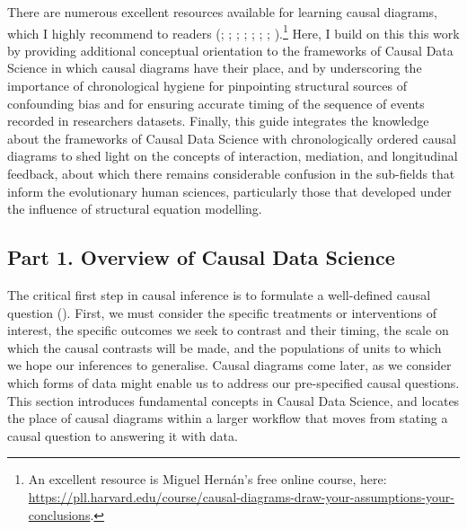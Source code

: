 \documentclass[
  singlecolumn,
  9pt]{article}
\begin{document}
There are numerous excellent resources available for learning causal
diagrams, which I highly recommend to readers
(;
;
;
;
;
; ; ).\footnote{An excellent resource is Miguel Hernán's free online
  course, here:
  \url{https://pll.harvard.edu/course/causal-diagrams-draw-your-assumptions-your-conclusions}.}
Here, I build on this this work by providing additional conceptual
orientation to the frameworks of Causal Data Science in which causal
diagrams have their place, and by underscoring the importance of
chronological hygiene for pinpointing structural sources of confounding
bias and for ensuring accurate timing of the sequence of events recorded
in researchers datasets. Finally, this guide integrates the knowledge
about the frameworks of Causal Data Science with chronologically ordered
causal diagrams to shed light on the concepts of interaction, mediation,
and longitudinal feedback, about which there remains considerable
confusion in the sub-fields that inform the evolutionary human sciences,
particularly those that developed under the influence of structural
equation modelling.

\subsection{Part 1. Overview of Causal Data
Science}\label{part-1.-overview-of-causal-data-science}

The critical first step in causal inference is to formulate a
well-defined causal question (). First, we must consider the specific treatments or
interventions of interest, the specific outcomes we seek to contrast and
their timing, the scale on which the causal contrasts will be made, and
the populations of units to which we hope our inferences to generalise.
Causal diagrams come later, as we consider which forms of data might
enable us to address our pre-specified causal questions. This section
introduces fundamental concepts in Causal Data Science, and locates the
place of causal diagrams within a larger workflow that moves from
stating a causal question to answering it with data.
\end{document}
